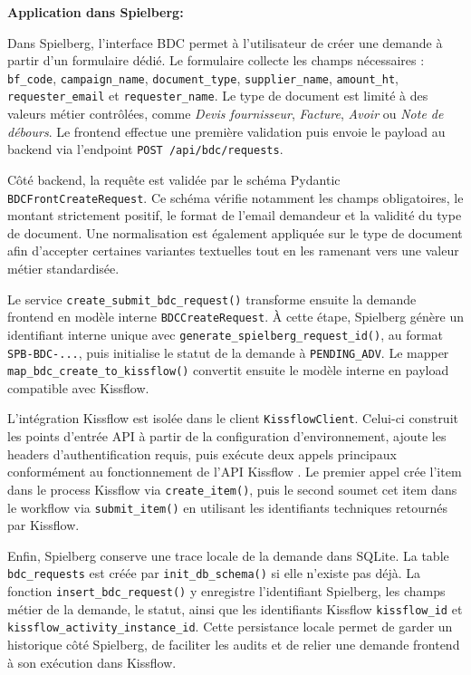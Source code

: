 \documentclass[a4paper,11pt,english,openany]{book}
\begin{document}
\textbf{Application dans Spielberg:}

Dans Spielberg, l'interface BDC permet à l'utilisateur de créer une demande à partir d'un formulaire dédié. Le formulaire collecte les champs nécessaires : \texttt{bf\_code}, \texttt{campaign\_name}, \texttt{document\_type}, \texttt{supplier\_name}, \texttt{amount\_ht}, \texttt{requester\_email} et \texttt{requester\_name}. Le type de document est limité à des valeurs métier contrôlées, comme \textit{Devis fournisseur}, \textit{Facture}, \textit{Avoir} ou \textit{Note de débours}. Le frontend effectue une première validation puis envoie le payload au backend via l'endpoint \texttt{POST /api/bdc/requests}.

Côté backend, la requête est validée par le schéma Pydantic \texttt{BDCFrontCreateRequest}. Ce schéma vérifie notamment les champs obligatoires, le montant strictement positif, le format de l'email demandeur et la validité du type de document. Une normalisation est également appliquée sur le type de document afin d'accepter certaines variantes textuelles tout en les ramenant vers une valeur métier standardisée.

Le service \texttt{create\_submit\_bdc\_request()} transforme ensuite la demande frontend en modèle interne \texttt{BDCCreateRequest}. À cette étape, Spielberg génère un identifiant interne unique avec \texttt{generate\_spielberg\_request\_id()}, au format \texttt{SPB-BDC-...}, puis initialise le statut de la demande à \texttt{PENDING\_ADV}. Le mapper \texttt{map\_bdc\_create\_to\_kissflow()} convertit ensuite le modèle interne en payload compatible avec Kissflow.

L'intégration Kissflow est isolée dans le client \texttt{KissflowClient}. Celui-ci construit les points d'entrée API à partir de la configuration d'environnement, ajoute les headers d'authentification requis, puis exécute deux appels principaux conformément au fonctionnement de l'API Kissflow \cite{kissflowapi}. Le premier appel crée l'item dans le process Kissflow via \texttt{create\_item()}, puis le second soumet cet item dans le workflow via \texttt{submit\_item()} en utilisant les identifiants techniques retournés par Kissflow.

Enfin, Spielberg conserve une trace locale de la demande dans SQLite. La table \texttt{bdc\_requests} est créée par \texttt{init\_db\_schema()} si elle n'existe pas déjà. La fonction \texttt{insert\_bdc\_request()} y enregistre l'identifiant Spielberg, les champs métier de la demande, le statut, ainsi que les identifiants Kissflow \texttt{kissflow\_id} et \texttt{kissflow\_activity\_instance\_id}. Cette persistance locale permet de garder un historique côté Spielberg, de faciliter les audits et de relier une demande frontend à son exécution dans Kissflow.
\end{document}
